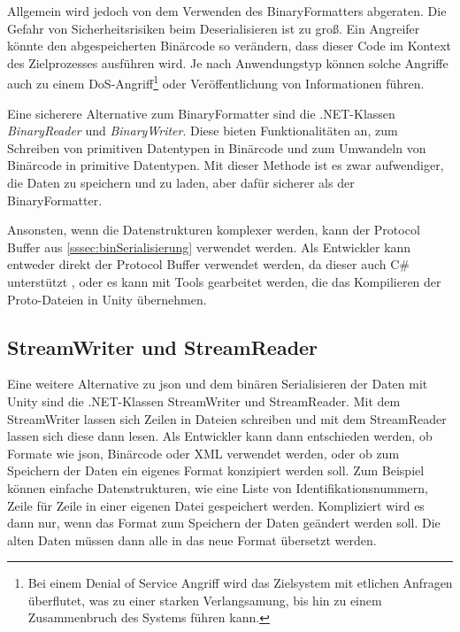 Allgemein wird jedoch von dem Verwenden des BinaryFormatters abgeraten. Die Gefahr von Sicherheitsrisiken beim Deserialisieren ist zu groß. Ein Angreifer könnte den abgespeicherten Binärcode so verändern, dass dieser Code im Kontext des Zielprozesses ausführen wird. Je nach Anwendungstyp können solche Angriffe auch zu einem DoS-Angriff\footnote{Bei einem Denial of Service Angriff wird das Zielsystem mit etlichen Anfragen überflutet, was zu einer starken Verlangsamung, bis hin zu einem Zusammenbruch des Systems führen kann.\cite{bundDoSDDoSAttacken}} oder Veröffentlichung von Informationen führen.\cite{microsoftDeserializationRisks}

Eine sicherere Alternative zum BinaryFormatter sind die .NET-Klassen \textit{BinaryReader} und \textit{BinaryWriter}. Diese bieten Funktionalitäten an, zum Schreiben von primitiven Datentypen in Binärcode und zum Umwandeln von Binärcode in primitive Datentypen. Mit dieser Methode ist es zwar aufwendiger, die Daten zu speichern und zu laden, aber dafür sicherer als der BinaryFormatter.\cite{microsoftBinaryReaderClass}\cite{microsoftBinaryWriterClass} 

Ansonsten, wenn die Datenstrukturen komplexer werden, kann der Protocol Buffer aus \ref{sssec:binSerialisierung} verwendet werden. Als Entwickler kann entweder direkt der Protocol Buffer verwendet werden, da dieser auch C\# unterstützt \cite{protobufLanguageGuide}, oder es kann mit Tools gearbeitet werden, die das Kompilieren der Proto-Dateien in Unity übernehmen.\cite{githubProtobufUnity}



\subsection{StreamWriter und StreamReader}
Eine weitere Alternative zu \ac{json} und dem binären Serialisieren der Daten mit Unity sind die .NET-Klassen StreamWriter und StreamReader. Mit dem StreamWriter lassen sich Zeilen in Dateien schreiben und mit dem StreamReader lassen sich diese dann lesen.\cite{microsoftStreamWriterKlasse}\cite{microsoftStreamReaderKlasse} Als Entwickler kann dann entschieden werden, ob Formate wie \ac{json}, Binärcode oder XML verwendet werden, oder ob zum Speichern der Daten ein eigenes Format konzipiert werden soll. Zum Beispiel können einfache Datenstrukturen, wie eine Liste von Identifikationsnummern, Zeile für Zeile in einer eigenen Datei gespeichert werden. Kompliziert wird es dann nur, wenn das Format zum Speichern der Daten geändert werden soll. Die alten Daten müssen dann alle in das neue Format übersetzt werden.



